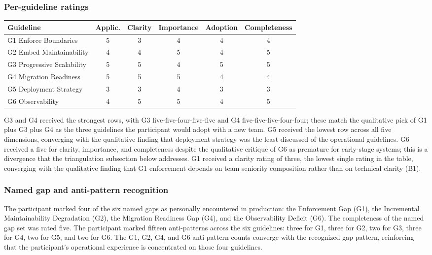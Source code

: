 \subsubsection*{Per-guideline ratings}

\begin{longtable}{p{2.5cm} c c c c c}
\toprule
\textbf{Guideline} & \textbf{Applic.} & \textbf{Clarity} & \textbf{Importance} & \textbf{Adoption} & \textbf{Completeness} \\
\midrule
\endhead
G1 Enforce Boundaries & 5 & 3 & 4 & 4 & 4 \\
G2 Embed Maintainability & 4 & 4 & 5 & 4 & 5 \\
G3 Progressive Scalability & 5 & 5 & 4 & 5 & 5 \\
G4 Migration Readiness & 5 & 5 & 5 & 4 & 4 \\
G5 Deployment Strategy & 3 & 3 & 4 & 3 & 3 \\
G6 Observability & 4 & 5 & 5 & 4 & 5 \\
\bottomrule
\end{longtable}

\noindent
G3 and G4 received the strongest rows, with G3 five-five-four-five-five and G4 five-five-five-four-four; these match the qualitative pick of G1 plus G3 plus G4 as the three guidelines the participant would adopt with a new team. G5 received the lowest row across all five dimensions, converging with the qualitative finding that deployment strategy was the least discussed of the operational guidelines. G6 received a five for clarity, importance, and completeness despite the qualitative critique of G6 as premature for early-stage systems; this is a divergence that the triangulation subsection below addresses. G1 received a clarity rating of three, the lowest single rating in the table, converging with the qualitative finding that G1 enforcement depends on team seniority composition rather than on technical clarity (B1).

\subsubsection*{Named gap and anti-pattern recognition}

The participant marked four of the six named gaps as personally encountered in production: the Enforcement Gap (G1), the Incremental Maintainability Degradation (G2), the Migration Readiness Gap (G4), and the Observability Deficit (G6). The completeness of the named gap set was rated five. The participant marked fifteen anti-patterns across the six guidelines: three for G1, three for G2, two for G3, three for G4, two for G5, and two for G6. The G1, G2, G4, and G6 anti-pattern counts converge with the recognized-gap pattern, reinforcing that the participant's operational experience is concentrated on those four guidelines.

